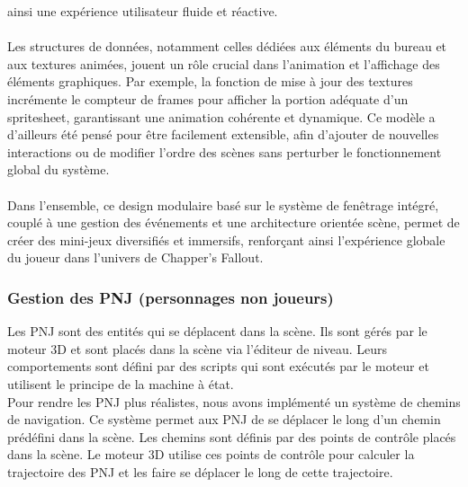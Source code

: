 ainsi une expérience utilisateur fluide et réactive.
\\ \\
Les structures de données, notamment celles dédiées aux éléments du bureau et aux textures animées, jouent un rôle crucial dans l’animation et 
l’affichage des éléments graphiques. Par exemple, la fonction de mise à jour des textures incrémente le compteur de frames pour afficher la portion adéquate d’un 
spritesheet, garantissant une animation cohérente et dynamique. Ce modèle a d’ailleurs été pensé pour être facilement extensible, afin d’ajouter de nouvelles 
interactions ou de modifier l’ordre des scènes sans perturber le fonctionnement global du système.
\\ \\
Dans l’ensemble, ce design modulaire basé sur le système de fenêtrage intégré, couplé à une gestion des événements et une architecture orientée scène, permet de 
créer des mini-jeux diversifiés et immersifs, renforçant ainsi l’expérience globale du joueur dans l’univers de Chapper's Fallout.

\subsubsection{Gestion des PNJ (personnages non joueurs)}

Les PNJ sont des entités qui se déplacent dans la scène. Ils sont gérés par le moteur
3D et sont placés dans la scène via l'éditeur de niveau. Leurs comportements sont
défini par des scripts qui sont exécutés par le moteur et utilisent le principe
de la machine à état.\\

Pour rendre les PNJ plus réalistes, nous avons implémenté un système de chemins
de navigation. Ce système permet aux PNJ de se déplacer le long d'un chemin prédéfini
dans la scène. Les chemins sont définis par des points de contrôle placés dans
la scène. Le moteur 3D utilise ces points de contrôle pour calculer la trajectoire
des PNJ et les faire se déplacer le long de cette trajectoire.

